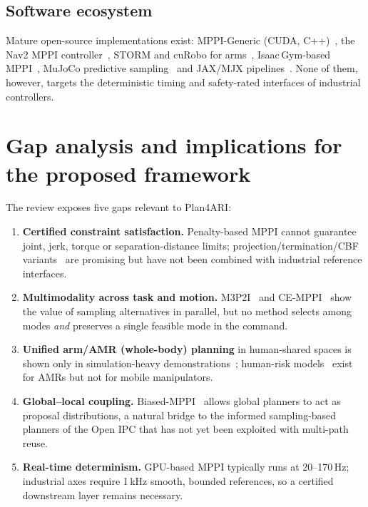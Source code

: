 \subsection{Software ecosystem}
Mature open-source implementations exist: MPPI-Generic (CUDA, C++)~\cite{vlahov2024mppigeneric}, the Nav2 MPPI controller~\cite{macenski2023nav2survey}, STORM and cuRobo for arms~\cite{bhardwaj2021storm,sundaralingam2023curobo}, Isaac\,Gym-based MPPI~\cite{pezzato2025isaacmppi}, MuJoCo predictive sampling~\cite{howell2022predictivesampling} and JAX/MJX pipelines~\cite{dierking2026parallelsbmpc}. None of them, however, targets the deterministic timing and safety-rated interfaces of industrial controllers.

\ifsotafull
\section{Gap analysis and implications for the proposed framework}\label{sec:gap}
The review exposes five gaps relevant to Plan4ARI:
\begin{enumerate}
\item \textbf{Certified constraint satisfaction.} Penalty-based MPPI cannot guarantee joint, jerk, torque or separation-distance limits; projection/termination/CBF variants~\cite{lee2026prmppi,gursoy2026cosmik,rabiee2025gsmppi} are promising but have not been combined with industrial reference interfaces.
\item \textbf{Multimodality across task and motion.} M3P2I~\cite{zhang2024m3p2i} and CE-MPPI~\cite{liu2026clusteringmppi} show the value of sampling alternatives in parallel, but no method selects among modes \emph{and} preserves a single feasible mode in the command.
\item \textbf{Unified arm/AMR (whole-body) planning} in human-shared spaces is shown only in simulation-heavy demonstrations~\cite{pezzato2025isaacmppi}; human-risk models~\cite{trevisan2025drampi} exist for AMRs but not for mobile manipulators.
\item \textbf{Global--local coupling.} Biased-MPPI~\cite{trevisan2024biasedmppi} allows global planners to act as proposal distributions, a natural bridge to the informed sampling-based planners of the Open IPC that has not yet been exploited with multi-path reuse.
\item \textbf{Real-time determinism.} GPU-based MPPI typically runs at 20--170\,Hz; industrial axes require 1\,kHz smooth, bounded references, so a certified downstream layer remains necessary.
\end{enumerate}


